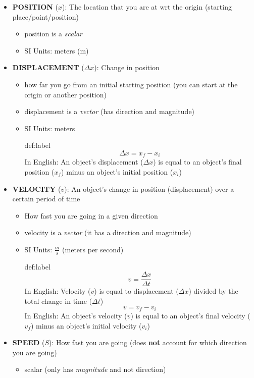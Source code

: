 \documentclass{package/notes}
\begin{document}
\begin{itemize}
	\item \textbf{POSITION} ($x$): The location that you are at wrt the origin (starting place/point/position)
	\begin{itemize}
		\item position is a \textit{scalar}
		\item SI Units: meters (m)
	\end{itemize}
	\item \textbf{DISPLACEMENT} ($\Delta x$): Change in position
	\begin{itemize}
		\item how far you go from an initial starting position (you can start at the origin or another position)
		\item displacement is a \textit{vector} (has direction and magnitude)
		\item SI Units: meters
		\begin{definition}{def:label}
			$$\Delta x = x_f - x_i$$
			In English: An object's displacement ($\Delta x$) is equal to an object's final position ($x_f$) minus an object's initial position ($x_i$) 
		\end{definition}
	\end{itemize}
	\item \textbf{VELOCITY} ($v$): An object's change in position (displacement) over a certain period of time
	\begin{itemize}
		\item How fast you are going in a given direction
		\item velocity is a \textit{vector} (it has a direction and magnitude)
		\item SI Units: $\frac{m}{s}$ (meters per second)\newpage
		\begin{definition}{def:label}
			$$v = \frac{\Delta x}{\Delta t}$$
			In English: Velocity ($v$) is equal to displaecment ($\Delta x$) divided by the total change in time ($\Delta t$)
			$$v = v_f - v_i$$
			In English: An object's velocity ($v$) is equal to an object's final velocity ($v_f$) minus an object's initial velocity ($v_i$) 
		\end{definition}
	\end{itemize}
	\item \textbf{SPEED} ($S$): How fast you are going (does \textbf{not} account for which direction you are going)
	\begin{itemize}
		\item scalar (only has \textit{magnitude} and not direction)

\end{itemize}
\end{itemize}
\end{document}
